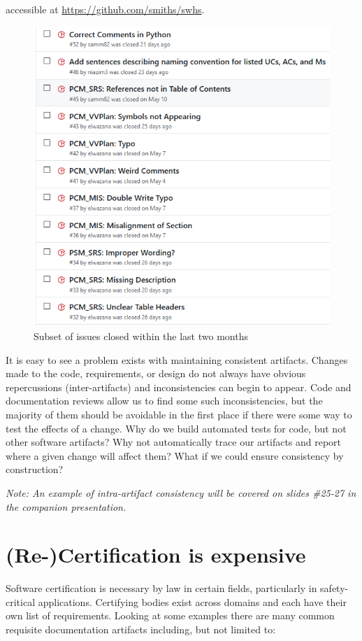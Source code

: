 \documentclass[twocolumn]{article}
\begin{document}
accessible at \url{https://github.com/smiths/swhs}.
\begin{figure}[!htbp]
  \centering
  \includegraphics[width=0.8\linewidth]{RecentIssuesSWHS.PNG}
  \caption{Subset of issues closed within the last two months}
  \label{Fig:ClosedIssues}
\end{figure}

It is easy to see a problem exists with maintaining consistent artifacts. 
Changes made to the code, requirements, or design do not always have obvious 
repercussions (inter-artifacts) and inconsistencies can begin to appear. Code 
and documentation reviews allow us to find some such inconsistencies, but the 
majority of them should be avoidable in the first place if there were some way 
to test the effects of a change. Why do we build automated tests for code, but 
not other software artifacts? Why not automatically trace our 
artifacts and report where a given change will affect them? What if we could 
ensure consistency by construction?

\emph{Note: An example of intra-artifact consistency will be covered on slides 
\#25-27 in the companion presentation.}

\section{(Re-)Certification is expensive}

Software certification is necessary by law in certain fields, particularly in 
safety-critical applications. Certifying bodies exist across domains 
and each have their own list of requirements. Looking at some 
examples \cite{CDRH2002,CSA1999,CSA2009,FDA2014} there are many common  
requisite documentation artifacts including, but not limited to:
\end{document}
